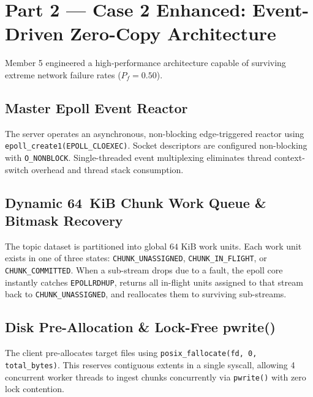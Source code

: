 \documentclass[11pt,a4paper]{article}
\begin{document}
\section{Part 2 --- Case 2 Enhanced: Event-Driven Zero-Copy Architecture}

Member 5 engineered a high-performance architecture capable of surviving extreme network failure rates ($P_f = 0.50$).

\subsection{Master Epoll Event Reactor}
The server operates an asynchronous, non-blocking edge-triggered reactor using \texttt{epoll\_create1(EPOLL\_CLOEXEC)}. Socket descriptors are configured non-blocking with \texttt{O\_NONBLOCK}. Single-threaded event multiplexing eliminates thread context-switch overhead and thread stack consumption.

\subsection{Dynamic 64~KiB Chunk Work Queue \& Bitmask Recovery}
The topic dataset is partitioned into global $64\text{ KiB}$ work units. Each work unit exists in one of three states:
\texttt{CHUNK\_UNASSIGNED}, \texttt{CHUNK\_IN\_FLIGHT}, or \texttt{CHUNK\_COMMITTED}.
When a sub-stream drops due to a fault, the epoll core instantly catches \texttt{EPOLLRDHUP}, returns all in-flight units assigned to that stream back to \texttt{CHUNK\_UNASSIGNED}, and reallocates them to surviving sub-streams.

\subsection{Disk Pre-Allocation \& Lock-Free pwrite()}
The client pre-allocates target files using \texttt{posix\_fallocate(fd, 0, total\_bytes)}. This reserves contiguous extents in a single syscall, allowing 4 concurrent worker threads to ingest chunks concurrently via \texttt{pwrite()} with zero lock contention.

\end{document}
